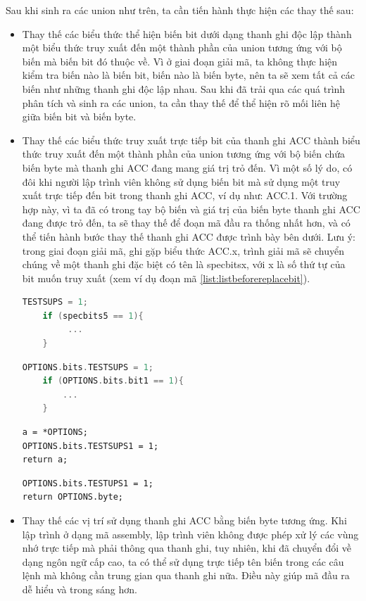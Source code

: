 Sau khi sinh ra các union như trên, ta cần tiến hành thực hiện các thay thế sau:
\begin{itemize}
	\item Thay thế các biểu thức thể hiện biến bit dưới dạng thanh ghi độc lập thành một biểu thức truy xuất đến một thành phần của union tương ứng với bộ biến mà biến bit đó thuộc về. Vì ở giai đoạn giải mã, ta không thực hiện kiểm tra biến nào là biến bit, biến nào là biến byte, nên ta sẽ xem tất cả các biến như những thanh ghi độc lập nhau. Sau khi đã trải qua các quá trình phân tích và sinh ra các union, ta cần thay thế để thể hiện rõ mối liên hệ giữa biến bit và biến byte.
	
	\item Thay thế các biểu thức truy xuất trực tiếp bit của thanh ghi ACC thành biểu thức truy xuất đến một thành phần của union tương ứng với bộ biến chứa biến byte mà thanh ghi ACC đang mang giá trị trỏ đến. Vì một số lý do, có đôi khi người lập trình viên không sử dụng biến bit mà sử dụng một truy xuất trực tiếp đến bit trong thanh ghi ACC, ví dụ như: ACC.1. Với trường hợp này, vì ta đã có trong tay bộ biến và giá trị của biến byte thanh ghi ACC đang được trỏ đến, ta sẽ thay thế để đoạn mã đầu ra thống nhất hơn, và có thể tiến hành bước thay thế thanh ghi ACC được trình bày bên dưới. Lưu ý: trong giai đoạn giải mã, ghi gặp biểu thức ACC.x, trình giải mã sẽ chuyển chúng về một thanh ghi đặc biệt có tên là specbitsx, với x là số thứ tự của bit muốn truy xuất (xem ví dụ đoạn mã \ref{list:listbeforereplacebit}).
	\begin{lstlisting}[caption={Mã đầu ra trước khi thực hiện bước thay thế biến bit},label={list:listbeforereplacebit}, language = c]
	TESTSUPS = 1;
	if (specbits5 == 1){
		 ...
	}
	\end{lstlisting}
	
	\begin{lstlisting}[caption={Mã đầu ra sau khi thực hiện bước thay thế biến bit},label={list:listafterreplacebit}, language = c]
	OPTIONS.bits.TESTSUPS = 1;
	if (OPTIONS.bits.bit1 == 1){
		...
	}
	\end{lstlisting}
\begin{lstlisting}[caption={Mã đầu ra trước khi thực hiện bước thay thế thanh ghi ACC},label={list:listbeforereplace}]
a = *OPTIONS;
OPTIONS.bits.TESTSUPS1 = 1;
return a;
\end{lstlisting}
\begin{lstlisting}[caption={Mã đầu ra sau khi thực hiện bước thay thế thanh ghi ACC},label={list:listafterreplace}]
OPTIONS.bits.TESTUPS1 = 1;
return OPTIONS.byte;
\end{lstlisting}
\item Thay thế các vị trí sử dụng thanh ghi ACC bằng biến byte tương ứng. Khi lập trình ở dạng mã assembly, lập trình viên không được phép xử lý các vùng nhớ trực tiếp mà phải thông qua thanh ghi, tuy nhiên, khi đã chuyển đổi về dạng ngôn ngữ cấp cao, ta có thể sử dụng trực tiếp tên biến trong các câu lệnh mà không cần trung gian qua thanh ghi nữa. Điều này giúp mã đầu ra dễ hiểu và trong sáng hơn.


\end{itemize}
